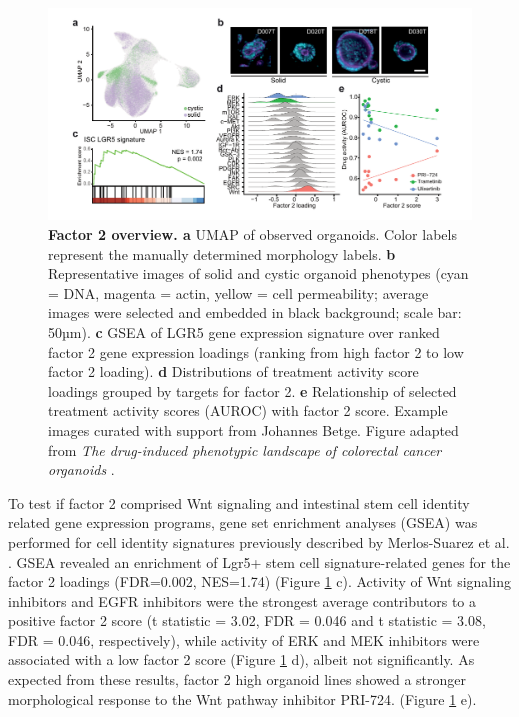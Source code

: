 \begin{flushleft}
\begin{figure}[h!]
\centering
\includegraphics[width=\textwidth,
                height=\textheight,
                keepaspectratio]{figures/promise/pdf/fig_5_1.pdf}
\caption[Factor 2 overview]{\textbf{Factor 2 overview. a} UMAP of observed organoids. Color labels represent the manually determined morphology labels. \textbf{b} Representative images of solid and cystic organoid phenotypes (cyan = DNA, magenta = actin, yellow = cell permeability; average images were selected and embedded in black background; scale bar: 50µm). \textbf{c} GSEA of LGR5 gene expression signature over ranked factor 2 gene expression loadings (ranking from high factor 2 to low factor 2 loading). \textbf{d} Distributions of treatment activity score loadings grouped by targets for factor 2. \textbf{e} Relationship of selected treatment activity scores (AUROC) with factor 2 score. Example images curated with support from Johannes Betge. Figure adapted from \textit{The drug-induced phenotypic landscape of colorectal cancer organoids} \cite{Betge2022-kr}.}
\label{fig_251}
\end{figure}
\bigbreak

To test if factor 2 comprised Wnt signaling and intestinal stem cell identity related gene expression programs, gene set enrichment analyses (GSEA) was performed for cell identity signatures previously described by Merlos-Suarez et al. \cite{Merlos-Suarez2011-gd}. GSEA revealed an enrichment of Lgr5+ stem cell signature-related genes for the factor 2 loadings (FDR=0.002, NES=1.74) (Figure \ref{fig_251} c). Activity of Wnt signaling inhibitors and EGFR inhibitors were the strongest average contributors to a positive factor 2 score (t statistic = 3.02, FDR = 0.046 and t statistic = 3.08, FDR = 0.046, respectively), while activity of ERK and MEK inhibitors were associated with a low factor 2 score (Figure \ref{fig_251} d), albeit not significantly. As expected from these results, factor 2 high organoid lines showed a stronger morphological response to the Wnt pathway inhibitor PRI-724. (Figure \ref{fig_251} e).


\end{flushleft}

